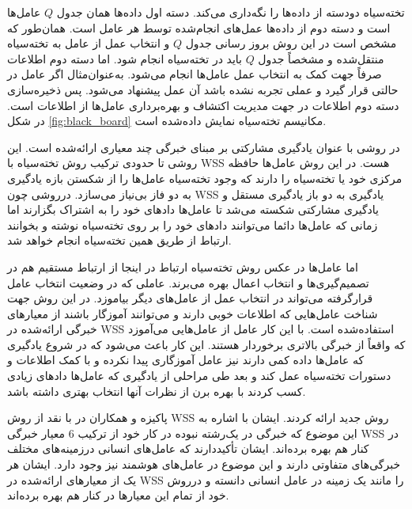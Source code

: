 تخته‌سیاه دودسته از داده‌ها را نگه‌داری می‌کند. دسته اول داده‌ها همان جدول $Q$ عامل‌ها است و دسته دوم از داده‌ها عمل‌های انجام‌شده توسط هر عامل است. همان‌طور که مشخص است در این روش بروز رسانی جدول $Q$ و انتخاب عمل از عامل به تخته‌سیاه منتقل‌شده و مشخصاً جدول $Q$ باید در تخته‌سیاه انجام شود. اما دسته دوم اطلاعات صرفاً جهت کمک به انتخاب عمل عامل‌ها انجام می‌شود. به‌عنوان‌مثال اگر عامل در حالتی قرار گیرد و عملی تجربه نشده باشد آن عمل پیشنهاد می‌شود. پس ذخیره‌سازی دسته دوم اطلاعات در جهت مدیریت اکتشاف و بهره‌برداری عامل‌ها از اطلاعات است. در شکل \ref{fig:black_board} مکانیسم تخته‌سیاه نمایش داده‌شده است.


در روشی با عنوان یادگیری مشارکتی بر مبنای خبرگی چند معیاری ارائه‌شده است. این روشی تا حدودی ترکیب روش تخته‌سیاه با WSS هست. در این روش عامل‌ها حافظه مرکزی خود یا تخته‌سیاه را دارند که وجود تخته‌سیاه عامل‌ها را از شکستن بازه یادگیری به دو فاز بی‌نیاز می‌سازد. درروشی چون WSS یادگیری به دو باز یادگیری مستقل و یادگیری مشارکتی شکسته می‌شد تا عامل‌ها دادهای خود را به اشتراک بگزارند اما زمانی که عامل‌ها دائما می‌توانند دادهای خود را بر روی تخته‌سیاه نوشته و بخوانند ارتباط از طریق همین تخته‌سیاه انجام خواهد شد.

اما عامل‌ها در عکس روش تخته‌سیاه ارتباط در اینجا از ارتباط مستقیم هم در تصمیم‌گیری‌ها و انتخاب اعمال بهره می‌برند. عاملی که در وضعیت انتخاب عامل قرارگرفته می‌تواند در انتخاب عمل از عامل‌های دیگر بیاموزد. در این روش جهت شناخت عامل‌هایی که اطلاعات خوبی دارند و می‌توانند آموزگار باشند از معیارهای خبرگی ارائه‌شده در WSS استفاده‌شده است. با این کار عامل از عامل‌هایی می‌آموزد که واقعاً از خبرگی بالاتری برخوردار هستند. این کار باعث می‌شود که در شروع یادگیری که عامل‌ها داده کمی دارند نیز عامل آموزگاری پیدا نکرده و با کمک اطلاعات و دستورات تخته‌سیاه عمل کند و بعد طی مراحلی از یادگیری که عامل‌ها دادهای زیادی کسب کردند با بهره برن از نظرات آنها انتخاب بهتری داشته باشد.

پاکیزه و همکاران در با نقد از روش WSS روش جدید ارائه کردند. ایشان با اشاره به این موضوع که خبرگی در یک‌رشته نبوده در کار خود از ترکیب 6 معیار خبرگی WSS در کنار هم بهره برده‌اند. ایشان تأکیددارند که عامل‌های انسانی درزمینه‌های مختلف خبرگی‌های متفاوتی دارند و این موضوع در عامل‌های هوشمند نیز وجود دارد. ایشان هر یک از معیارهای ارائه‌شده در WSS را مانند یک زمینه در عامل انسانی دانسته و درروش خود از تمام این معیارها در کنار هم بهره برده‌اند.

